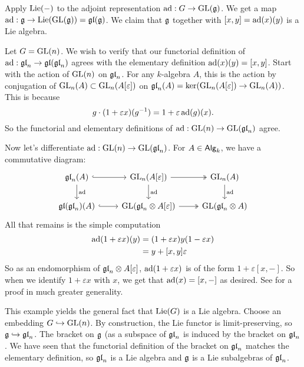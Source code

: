 Apply $\operatorname{Lie}(-)$ to the adjoint representation $\operatorname{ad}:G\to \operatorname{GL}(\mathfrak{g})$. We 
get a map $\operatorname{ad}:\mathfrak{g}\to \operatorname{Lie}(\operatorname{GL}(\mathfrak{g}))=\mathfrak{gl}(\mathfrak{g})$. We claim that 
$\mathfrak{g}$ together with $[x,y]=\operatorname{ad}(x)(y)$ is a Lie algebra. 

\begin{example}
Let $G=\operatorname{GL}(n)$. We wish to verify that our functorial definition of 
$\operatorname{ad}:\mathfrak{gl}_n\to \mathfrak{gl}(\mathfrak{gl}_n)$ agrees with the elementary definition 
$\operatorname{ad}(x)(y)=[x,y]$. Start with the action of $\operatorname{GL}(n)$ on 
$\mathfrak{gl}_n$. For any $k$-algebra $A$, this is the action by conjugation of 
$\operatorname{GL}_n(A)\subset \operatorname{GL}_n(A[\varepsilon])$ on 
$\mathfrak{gl}_n(A)=\ker(\operatorname{GL}_n(A[\varepsilon])\to \operatorname{GL}_n(A))$. This is because 
\[
  g\cdot (1+\varepsilon x)(g^{-1}) = 1+\varepsilon \operatorname{ad}(g)(x) .
\]
So the functorial and elementary definitions of $\operatorname{ad}:\operatorname{GL}(n)\to \operatorname{GL}(\mathfrak{gl}_n)$ 
agree. 

Now let's differentiate $\operatorname{ad}:\operatorname{GL}(n)\to \operatorname{GL}(\mathfrak{gl}_n)$. For 
$A\in \mathsf{Alg}_{k}$, we have a commutative diagram:
\[\begin{tikzcd}
  \gl_n(A) \ar[r, hook] \ar[d, "\adjoint"] 
    & \GL_n(A[\varepsilon]) \ar[r, twoheadrightarrow] \ar[d, "\adjoint"]
    & \GL_n(A) \ar[d, "\adjoint"] \\
  \gl(\gl_n)(A) \ar[r, hook]
    & \GL(\gl_n\otimes A[\varepsilon]) \ar[r, twoheadrightarrow] 
    & \GL(\gl_n\otimes A)
\end{tikzcd}\]
All that remains is the simple computation 
\begin{align*}
  \operatorname{ad}(1+ \varepsilon x)(y)
    &= (1+\varepsilon x)y(1-\varepsilon x) \\
    &= y+[x,y]\varepsilon
\end{align*}
So as an endomorphism of $\mathfrak{gl}_n\otimes A[\varepsilon]$, 
$\operatorname{ad}(1+\varepsilon x)$ is of the form $1+\varepsilon [x,-]$. So when we 
identify $1+\varepsilon x$ with $x$, we get that $\operatorname{ad}(x)=[x,-]$ as 
desired. See \cite[II 4.8]{sga3-i} for a proof in much greater generality. 
\end{example}

This example yields the general fact that $\operatorname{Lie}(G)$ is a Lie algebra. Choose an 
embedding $G\hookrightarrow \operatorname{GL}(n)$. By construction, the Lie functor is 
limit-preserving, so $\mathfrak{g}\hookrightarrow \mathfrak{gl}_n$. The bracket on $\mathfrak{g}$ (as a subspace of 
$\mathfrak{gl}_n$ is induced by the bracket on $\mathfrak{gl}_n$. We have seen that the functorial 
definition of the bracket on $\mathfrak{gl}_n$ matches the elementary definition, so 
$\mathfrak{gl}_n$ is a Lie algebra and $\mathfrak{g}$ is a Lie subalgebras of $\mathfrak{gl}_n$. 

